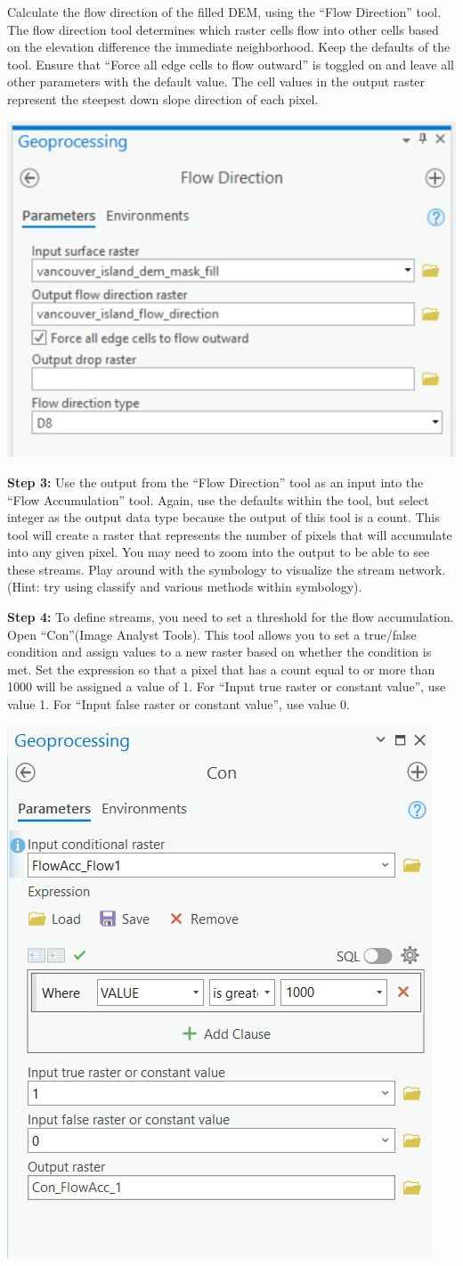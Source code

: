 \documentclass[
]{book}
\begin{document}
Calculate the flow direction of the filled DEM, using the ``Flow Direction'' tool. The flow direction tool determines which raster cells flow into other cells based on the elevation difference the immediate neighborhood. Keep the defaults of the tool. Ensure that ``Force all edge cells to flow outward'' is toggled on and leave all other parameters with the default value. The cell values in the output raster represent the steepest down slope direction of each pixel.

\includegraphics[width=0.5\linewidth]{images/02-flow-direction}

\textbf{Step 3:} Use the output from the ``Flow Direction'' tool as an input into the ``Flow Accumulation'' tool. Again, use the defaults within the tool, but select integer as the output data type because the output of this tool is a count. This tool will create a raster that represents the number of pixels that will accumulate into any given pixel. You may need to zoom into the output to be able to see these streams. Play around with the symbology to visualize the stream network. (Hint: try using classify and various methods within symbology).

\textbf{Step 4:} To define streams, you need to set a threshold for the flow accumulation. Open ``Con''(Image Analyst Tools). This tool allows you to set a true/false condition and assign values to a new raster based on whether the condition is met. Set the expression so that a pixel that has a count equal to or more than 1000 will be assigned a value of 1. For ``Input true raster or constant value'', use value 1. For ``Input false raster or constant value'', use value 0.

\includegraphics[width=0.5\linewidth]{images/02-con}
\end{document}
